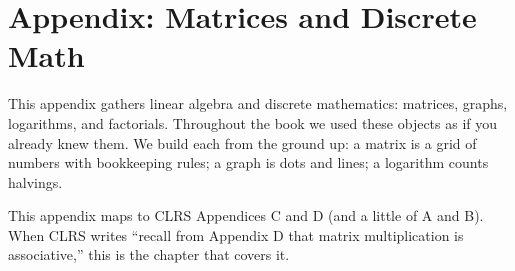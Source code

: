 \chapter{Appendix: Matrices and Discrete Math}
\label{ch39:matrices}

This appendix gathers linear algebra and
discrete mathematics: matrices, graphs, logarithms, and factorials. Throughout
the book we used these objects as if you already knew them.
We build each from the ground up: a matrix is a grid of numbers with
bookkeeping rules; a graph is dots and lines; a logarithm counts halvings.

\begin{focusbox}
This appendix maps to CLRS Appendices C and D (and a little of A and B). When
CLRS writes ``recall from Appendix D that matrix multiplication is associative,''
this is the chapter that covers it.
\end{focusbox}

